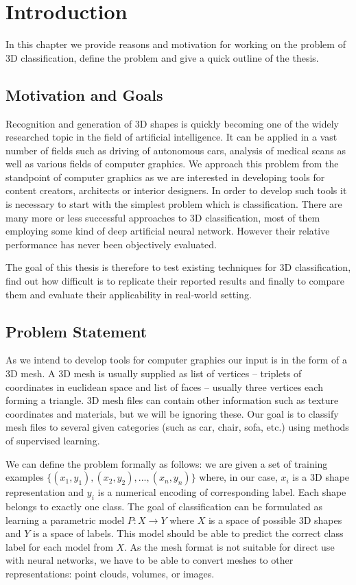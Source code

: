 \chapter{Introduction}
\label{sec:chap1}
In this chapter we provide reasons and motivation for working on the problem of 3D classification, define the problem and give a quick outline of the thesis.

\section{Motivation and Goals}
Recognition and generation of 3D shapes is quickly becoming one of the widely researched topic in the field of artificial intelligence. It can be applied in a vast number of fields such as driving of autonomous cars, analysis of medical scans as well as various fields of computer graphics. We approach this problem from the standpoint of computer graphics as we are interested in developing tools for content creators, architects or interior designers. In order to develop such tools it is necessary to start with the simplest problem which is classification. 
There are many more or less successful approaches to 3D classification, most of them employing some kind of deep artificial neural network. However their relative performance has never been objectively evaluated.\par
The goal of this thesis is therefore to test existing techniques for 3D classification, find out how difficult is to replicate their reported results and finally to compare them and evaluate their applicability in real-world setting.
\section{Problem Statement}
As we intend to develop tools for computer graphics our input is in the form of a 3D mesh. A 3D mesh is usually supplied as list of vertices -- triplets of coordinates in euclidean space and list of faces -- usually three vertices each forming a triangle. 3D mesh files can contain other information such as texture coordinates and materials, but we will be ignoring these. Our goal is to classify mesh files to several given categories (such as car, chair, sofa, etc.) using methods of supervised learning.\par
We can define the problem formally as follows: we are given a set of training examples $\{(x_1,y_1),(x_2,y_2), ..., (x_n,y_n)\}$ where, in our case, $x_i$ is a 3D shape representation and $y_i$ is a numerical encoding of corresponding label. Each shape belongs to exactly one class. The goal of classification can be formulated as learning a parametric model $P:X \rightarrow Y$ where $X$ is a space of possible 3D shapes and $Y$ is a space of labels. This model should be able to predict the correct class label for each model from $X$.
As the mesh format is not suitable for direct use with neural networks, we have to be able to convert meshes to other representations: point clouds, volumes, or images.
